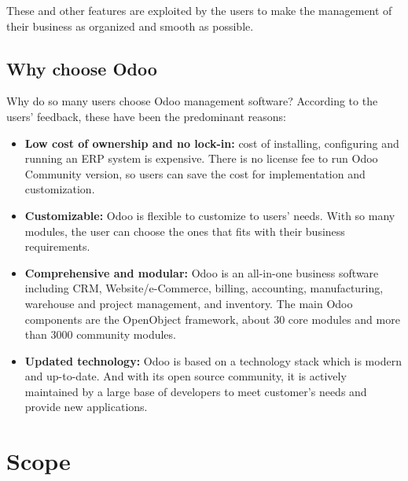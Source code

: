 These and other features are exploited by the users to make the management of their business as
organized and smooth as possible.

\subsection{Why choose Odoo}

Why do so many users choose Odoo management software? According to the users’ feedback, these
have been the predominant reasons:

\begin{itemize}
	\item \textbf{Low cost of ownership and no lock-in:} cost of installing, configuring and running an ERP
system is expensive. There is no license fee to run Odoo Community version, so users can
save the cost for implementation and customization. 
	\item \textbf{Customizable:} Odoo is flexible to customize to users’ needs. With so many modules, the
user can choose the ones that fits with their business requirements.
	\item \textbf{Comprehensive and modular:} Odoo is an all-in-one business software including CRM,
Website/e-Commerce, billing, accounting, manufacturing, warehouse and project
management, and inventory. The main Odoo components are the OpenObject framework,
about 30 core modules and more than 3000 community modules.
	\item \textbf{Updated technology:} Odoo is based on a technology stack which is modern and up-to-date.
And with its open source community, it is actively maintained by a large base of developers
to meet customer’s needs and provide new applications.
\end{itemize}

\section{Scope}

